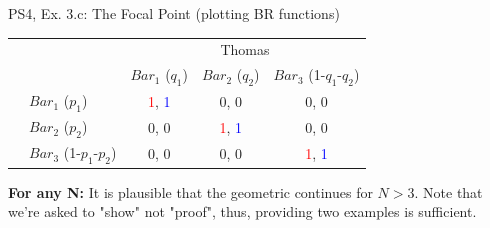 \begin{frame}{PS4, Ex. 3.c: The Focal Point (plotting BR functions)}
\begin{table}
      \begin{tabular}{cl|c|c|c|}
        & \multicolumn{1}{c}{} & \multicolumn{3}{c}{\color{blue}Thomas}\\
        & \multicolumn{1}{c}{} & \multicolumn{1}{c}{$Bar_1$ ($q_1$)} & \multicolumn{1}{c}{$Bar_2$ ($q_2$)} & \multicolumn{1}{c}{$Bar_3$ (1-$q_1$-$q_2$)} \\\cline{3-5}
        \parbox[t]{1mm}{}
        & $Bar_1$ ($p_1$) & \textcolor{red}{1}, \textcolor{blue}{1} & 0, 0 & 0, 0 \\
        & $Bar_2$ ($p_2$) & 0, 0 & \textcolor{red}{1}, \textcolor{blue}{1} & 0, 0 \\
        & $Bar_3$ (1-$p_1$-$p_2$) & 0, 0 & 0, 0 & \textcolor{red}{1}, \textcolor{blue}{1} \\
      \end{tabular}
    \end{table}
    \textbf{For any N:} It is plausible that the geometric continues for $N>3$. Note that we're asked to "show" not "proof", thus, providing two examples is sufficient.
\end{frame}
